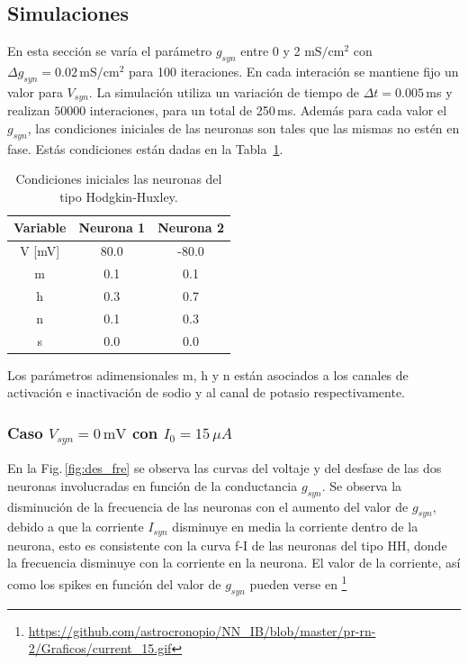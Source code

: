 \subsection{Simulaciones}

En esta sección se varía el parámetro $g_{syn}$ entre $0$ y 2 ${\text{mS}}/{\text{cm}^2}$ con $\Delta g_{syn}=0.02\,{\text{mS}}/{\text{cm}^2}$ para 100 iteraciones. En cada interación se mantiene fijo un valor para $V_{syn}$. La simulación utiliza un variación de tiempo de $\Delta t =  0.005\,$ms y realizan $50000$ interaciones, para un total de 250\,ms. Además para cada valor el $g_{syn}$, las condiciones iniciales de las neuronas son tales que las mismas no estén en fase. Estás condiciones están dadas en la Tabla~\ref{tab:ini}. 
    \begin{table}[H]
    \centering
    \begin{tabular}{c| c| c}
    {\bf Variable }& {\bf Neurona 1} & { \bf Neurona 2} \\ \hline
        V [mV]     & 80.0            & -80.0               \\  \hline
        m          & 0.1             & 0.1              \\  \hline
        h          & 0.3             & 0.7               \\  \hline
        n          & 0.1             & 0.3               \\  \hline
        s          & 0.0             & 0.0               \\      
    \end{tabular}
    \caption{Condiciones iniciales las neuronas del tipo Hodgkin-Huxley.}   
         \label{tab:ini}
    \end{table}
Los parámetros adimensionales m, h y n están asociados a los canales de activación e  inactivación de sodio y al canal de potasio respectivamente.

   \subsubsection{Caso \texorpdfstring{$V_{syn}= 0\,\text{mV}$}{}   con  \texorpdfstring{$I_0 = 15\,\mu A$}{}}

    En la Fig.\,\ref{fig:des_fre} se observa las curvas del voltaje y del desfase de las dos neuronas involucradas en función de la conductancia $g_{syn}$. Se observa la disminución de la frecuencia de las neuronas con el aumento del valor de $g_{syn}$, debido a que la corriente $I_{syn}$ disminuye en media la corriente dentro de la neurona, esto es consistente con la curva f-I de las neuronas del tipo HH, donde la frecuencia disminuye con la corriente en la neurona.    El valor de la corriente, así como los spikes en función del valor de $g_{syn}$ pueden verse en \footnote{\url{https://github.com/astrocronopio/NN_IB/blob/master/pr-rn-2/Graficos/current_15.gif}}

